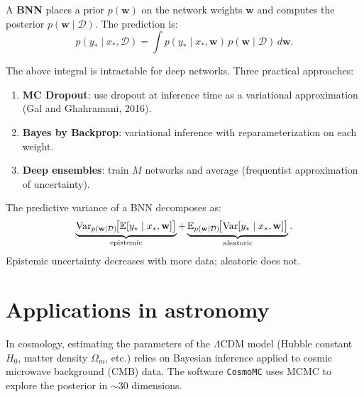 \begin{definition}
A \textbf{BNN} places a prior $p(\mathbf{w})$ on the network weights
$\mathbf{w}$ and computes the posterior $p(\mathbf{w} \mid \mathcal{D})$.
The prediction is:
\[
  p(y_* \mid x_*, \mathcal{D}) = \int p(y_* \mid x_*, \mathbf{w})\,
  p(\mathbf{w} \mid \mathcal{D})\,d\mathbf{w}.
\]
\end{definition}

\begin{remark}
The above integral is intractable for deep networks. Three practical
approaches:
\begin{enumerate}
  \item \textbf{MC Dropout}: use dropout at inference time as a variational
        approximation (Gal and Ghahramani, 2016).
  \item \textbf{Bayes by Backprop}: variational inference with
        reparameterization on each weight.
  \item \textbf{Deep ensembles}: train $M$ networks and average
        (frequentist approximation of uncertainty).
\end{enumerate}
\end{remark}

\begin{proposition}
The predictive variance of a BNN decomposes as:
\[
  \underbrace{\mathrm{Var}_{p(\mathbf{w} \mid \mathcal{D})}\!\bigl[\mathbb{E}[y_* \mid x_*, \mathbf{w}]\bigr]}_{\text{epistemic}}
  + \underbrace{\mathbb{E}_{p(\mathbf{w} \mid \mathcal{D})}\!\bigl[\mathrm{Var}[y_* \mid x_*, \mathbf{w}]\bigr]}_{\text{aleatoric}}.
\]
Epistemic uncertainty decreases with more data; aleatoric does not.
\end{proposition}

\section{Applications in astronomy}

\begin{example}
In cosmology, estimating the parameters of the $\Lambda$CDM model
(Hubble constant $H_0$, matter density $\Omega_m$, etc.) relies on
Bayesian inference applied to cosmic microwave background (CMB) data.
The software \texttt{CosmoMC} uses MCMC to explore the posterior in
$\sim 30$ dimensions.
\end{example}

